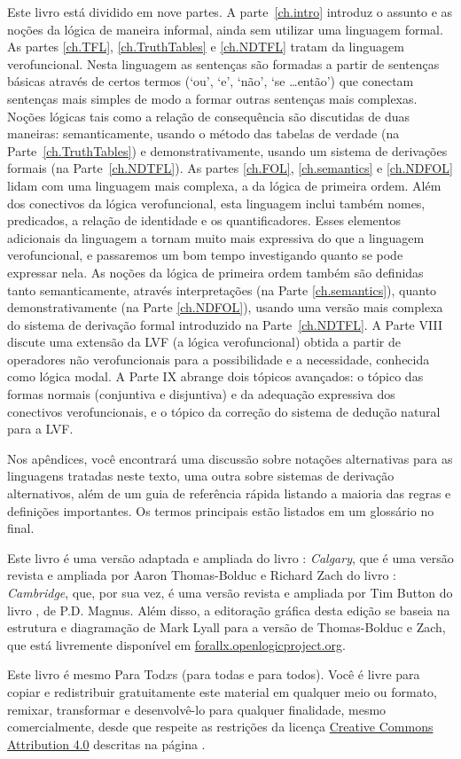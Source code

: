 Este livro está dividido em nove partes.
A parte~\ref{ch.intro} introduz o assunto e as noções da lógica de maneira informal, ainda sem utilizar uma linguagem formal.
As partes \ref{ch.TFL}, \ref{ch.TruthTables} e \ref{ch.NDTFL} tratam da linguagem verofuncional.  Nesta linguagem as sentenças são formadas a partir de sentenças básicas através de certos termos (`ou', `e', `não', `se \dots então') que conectam sentenças mais simples de modo a formar outras sentenças mais complexas.
Noções lógicas tais como a relação de consequência são discutidas de duas maneiras:
semanticamente, usando o método das tabelas de verdade (na Parte~\ref{ch.TruthTables}) e demonstrativamente, usando um sistema de derivações formais (na Parte~\ref{ch.NDTFL}).
As partes \ref{ch.FOL}, \ref{ch.semantics} e \ref{ch.NDFOL} lidam com uma linguagem mais complexa, a da lógica de primeira ordem.
Além dos conectivos da lógica verofuncional, esta linguagem inclui também nomes, predicados, a relação de identidade e os quantificadores.
Esses elementos adicionais da linguagem a tornam muito mais expressiva do que a linguagem verofuncional, e passaremos um bom tempo investigando quanto se pode expressar nela.
As noções da lógica de primeira ordem também são definidas tanto semanticamente, através interpretações (na Parte \ref{ch.semantics}), quanto demonstrativamente (na Parte \ref{ch.NDFOL}), usando uma versão mais complexa do sistema de derivação formal introduzido na Parte~\ref{ch.NDTFL}.
A Parte VIII discute uma extensão da LVF (a lógica verofuncional) obtida a partir de operadores não verofuncionais para a possibilidade e a necessidade, conhecida como lógica modal.
A Parte IX abrange dois tópicos avançados:
o tópico das formas normais (conjuntiva e disjuntiva) e da adequação expressiva dos conectivos verofuncionais, e o tópico da correção do sistema de dedução natural para a LVF.

Nos apêndices, você encontrará uma discussão sobre notações alternativas para as linguagens tratadas neste texto, uma outra sobre sistemas de derivação alternativos, além  de um guia de referência rápida listando a maioria das regras e definições importantes.
Os termos principais estão listados em um glossário no final.

Este livro  é uma versão adaptada e ampliada do livro \forallx: \emph{Calgary}, que é uma versão revista e ampliada por Aaron Thomas-Bolduc e Richard Zach do livro \forallx: \emph{Cambridge}, que, por sua vez, é uma versão revista e ampliada por Tim Button do livro \forallx, de P.D. Magnus.
Além disso, a editoração gráfica desta edição se baseia na estrutura e diagramação de Mark Lyall para a versão de Thomas-Bolduc e Zach, que está livremente disponível em \hbox{\href{https://forallx.openlogicproject.org}{forallx.openlogicproject.org}}.

Este livro é mesmo Para Tod$x$s (para todas e para todos).
Você é livre para copiar e redistribuir gratuitamente este material em qualquer meio ou formato, remixar, transformar e desenvolvê-lo para qualquer finalidade, mesmo comercialmente, desde que respeite as restrições da licença  \href{https://creativecommons.org/licenses/by/4.0/}{Creative Commons Attribution 4.0} descritas na página \pageref{cc4by}.


